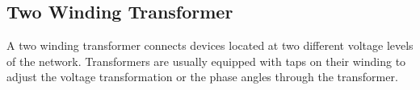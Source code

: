 \subsection{Two Winding Transformer}
\label{sec:2wtransformer}
A two winding transformer connects devices located at two different voltage levels of the network. 
Transformers are usually equipped with taps on their winding to adjust the voltage transformation or the phase angles through the transformer.
